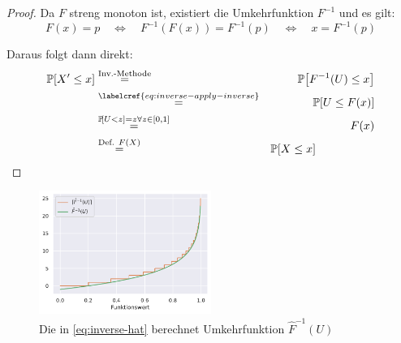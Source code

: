 \begin{proof}
    \noindent Da $F$ streng monoton ist, existiert die Umkehrfunktion $F^{-1}$ und es gilt:
    \begin{equation}\label{eq:inverse-apply-inverse}
        F(x) = p
        \quad\Leftrightarrow\quad F^{-1}(F(x)) = F^{-1}(p)
        \quad\Leftrightarrow\quad x = F^{-1}(p)
    \end{equation}

    \noindent Daraus folgt dann direkt:
    \begin{eqnarray}
        \prob{X' \le x} &\stackrel{\text{Inv.-Methode}} = & \prob{F^{-1}(U) \le x} \\
        &\stackrel{\labelcref{eq:inverse-apply-inverse}}{=}& \prob{U \le F(x)} \\
        &\stackrel{\prob{U < z} = z \forall z \in [0, 1]}=& F(x) \\
        &\stackrel{\text{Def. } F(X)}=& \prob{X \le x} \hspace{5em}\hfill \qedhere
    \end{eqnarray}
\end{proof}

\bigskip
\bigskip

\begin{figure}
    \begin{center}
        \includegraphics[width=0.5\textwidth]{data/geometric-distr-inv_hat.pdf}
    \end{center}
    \caption{Die in \cref{eq:inverse-hat} berechnet Umkehrfunktion $\hat F^{-1}(U)$}

\end{figure}

